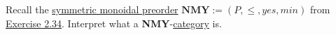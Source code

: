 Recall the \hyperref[D2.2]{symmetric monoidal preorder} $\mathbf{NMY} := (P,\leq, yes, min)$ from \hyperref[E2.34]{Exercise 2.34}. Interpret what a \textbf{NMY}-\hyperref[D2.46]{category} is.